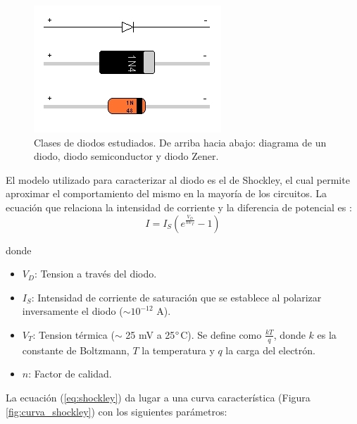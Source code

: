 \documentclass[twoside,twocolumn,a4paper]{article}
\begin{document}
\begin{figure}[h]
\captionsetup{justification=centering}
\includegraphics[width=\linewidth]{tipos_diodos.jpg}
\caption{Clases de diodos estudiados. De arriba hacia abajo: diagrama de un diodo, diodo semiconductor y diodo Zener.}
\label{fig:tipos_diodos}
\end{figure}

El modelo utilizado para caracterizar al diodo es el de Shockley, el cual permite aproximar el comportamiento del mismo en la mayor\'ia de los circuitos. La ecuaci\'on que relaciona la intensidad de corriente y la diferencia de potencial es \cite{eq:shockley}:
\begin{equation}
\label{eq:shockley}
I = I_{S}(e^\frac{V_{D}}{nV_{T}} - 1)
\end{equation}

donde

\begin{itemize}
\item 
$V_{D}$: Tension a trav\'es del diodo. 
\item 
$I_{S}$: Intensidad de corriente de saturaci\'on que se establece al polarizar inversamente el diodo ($\sim 10^{-12}$ A).
\item
$V_{T}$: Tension t\'ermica ($\sim$ 25 mV a 25$\degree$C). Se define como $\frac{kT}{q}$, donde $k$ es la constante de Boltzmann, $T$ la temperatura y $q$ la carga del electr\'on.
\item
$n$: Factor de calidad.
\end{itemize}

La ecuaci\'on (\ref{eq:shockley}) da lugar a una curva caracter\'istica (Figura \ref{fig:curva_shockley}) con los siguientes par\'ametros:
\end{document}
